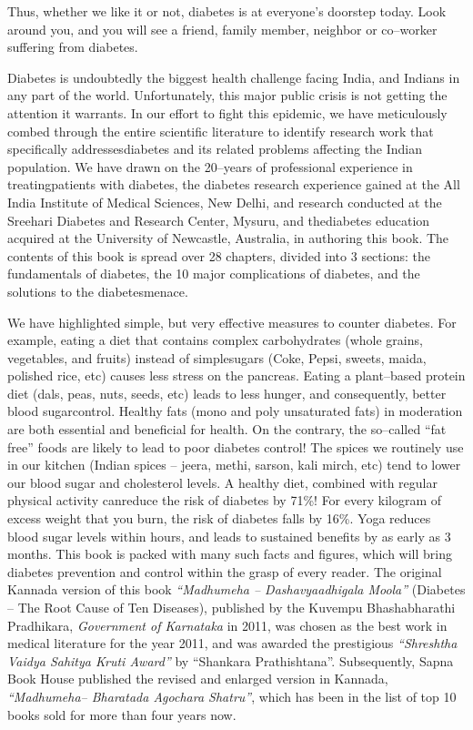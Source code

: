 Thus, whether we like it or not, diabetes is at everyone’s doorstep today. Look around you, and you will see a friend, family member, neighbor or co–worker suffering from diabetes.

Diabetes is undoubtedly the biggest health challenge facing India, and Indians in any part of the world. Unfortunately, this major public crisis is not getting the attention it warrants. In our effort to fight this epidemic, we have meticulously combed through the entire scienti\-fic literature to identify research work that specifically addresses\break diabetes and its related problems affecting the Indian population. We have drawn on the 20–years of professional experience in treating\break patients with diabetes, the diabetes research experience gained at the All India Institute of Medical Sciences, New Delhi, and research condu\-cted at the Sreehari Diabetes and Research Center, Mysuru, and the\break diabetes education acquired at the University of Newcastle, Australia, in authoring this book. The contents of this book is spread over 28 chapters, divided into 3 sections: the fundamentals of diabetes, the 10 major complications of diabetes, and the solutions to the diabetes\break menace.

We have highlighted simple, but very effective measures to cou\-nter diabetes. For example, eating a diet that contains complex carbohydrates (whole grains, vegetables, and fruits) instead of simple\break sugars (Coke, Pepsi, sweets, maida, polished rice, etc) causes less stress on the pancreas. Eating a plant–based protein diet (dals, peas, nuts, seeds, etc) leads to less hunger, and consequently, better blood sugar\break control. Healthy fats (mono and poly unsaturated fats) in moderation are both essential and beneficial for health. On the contrary, the so–called “fat free” foods are likely to lead to poor diabetes control! The spices we routinely use in our kitchen (Indian spices – jeera, methi, sarson, kali mirch, etc) tend to lower our blood sugar and choleste\-rol levels. A healthy diet, combined with regular physical activity can\break reduce the risk of diabetes by 71\%! For every kilogram of excess weight that you burn, the risk of diabetes falls by 16\%. Yoga reduces blood sugar levels within hours, and leads to sustained benefits by as early as 3 months. This book is packed with many such facts and figures, which will bring diabetes prevention and control within the grasp of every reader. The original Kannada version of this book \textit{“Madhumeha – Dashavyaadhigala Moola”} (Diabetes – The Root Cause of Ten Diseases), published by the Kuvempu Bhashabharathi Pradhikara, \textit{Government of Karnataka} in 2011, was chosen as the best work in medical literature for the year 2011, and was awarded the prestigious \textit{“Shreshtha Vaidya Sahitya Kruti Award”} by “Shankara Prathishtana”. Subsequently, Sapna Book House published the revised and enlarged version in Kannada, \textit{“Madhumeha– Bharatada Agochara Shatru”}, which has been in the list of top 10 books sold for more than four years now.

